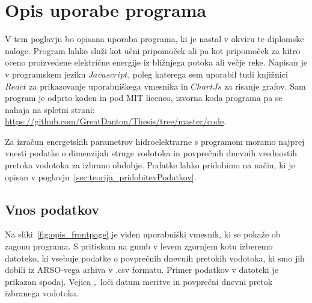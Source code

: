 \chapter{Opis uporabe programa}


V tem poglavju bo opisana uporaba programa, ki je nastal v okviru te diplomske naloge. Program lahko služi kot učni pripomoček ali pa kot pripomoček za hitro oceno proizvedene električne energije iz bližnjega potoka ali večje reke. Napisan je v programskem jeziku $Javascript$, poleg katerega sem uporabil tudi knjižnici $React$ za prikazovanje uporabniškega vmesnika in $ChartJs$ za risanje grafov. Sam program je odprto koden in pod MIT licenco, izvorna koda programa pa se nahaja na spletni strani: \href{https://github.com/GreatDanton/Thesis/tree/master/code}{https://github.com/GreatDanton/Thesis/tree/master/code}.

Za izračun energetskih parametrov hidroelektrarne s programom moramo najprej vnesti podatke o dimenzijah struge vodotoka in povprečnih dnevnih vrednostih pretoka vodotoka za izbrano obdobje. Podatke lahko pridobimo na način, ki je opisan v poglavju~\ref{sec:teorija_pridobitevPodatkov}.




\section{Vnos podatkov}
Na sliki~\ref{fig:opis_frontpage} je viden uporabniški vmesnik, ki se pokaže ob zagonu programa. S pritiskom na gumb v levem zgornjem kotu izberemo datoteko, ki vsebuje podatke o povprečnih dnevnih pretokih vodotoka, ki smo jih dobili iz ARSO-vega arhiva v .csv formatu. Primer podatkov v datoteki je prikazan spodaj. Vejica $,$ loči datum meritve in povprečni dnevni pretok izbranega vodotoka.

